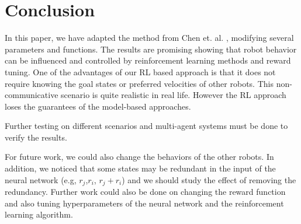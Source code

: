 \documentclass[conference]{IEEEtran}
\begin{document}
\section{Conclusion}
In this paper, we have adapted the method from Chen et. al. \cite{chen2017cadrl}, modifying several parameters and functions. The results are promising showing that robot behavior can be influenced and controlled by reinforcement learning methods and reward tuning. One of the advantages of our RL based approach is that it does not require knowing the goal states or preferred velocities of other robots. This non-communicative scenario is quite realistic in real life. However the RL approach loses the guarantees of the model-based approaches. 

Further testing on different scenarios and multi-agent systems must be done to verify the results. 

For future work, we could also change the behaviors of the other robots. In addition, we noticed that some states may be redundant in the input of the neural network (e.g, $ r_j $,$ r_i $, $r_j+r_i$) and we should study the effect of removing the redundancy. Further work could also be done on changing the reward function and also tuning hyperparameters of the neural network and the reinforcement learning algorithm.



\end{document}
